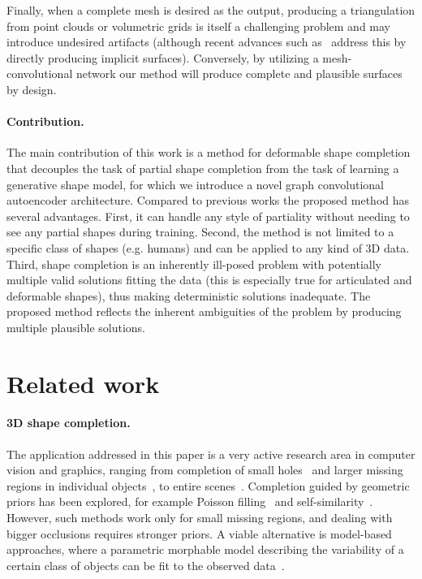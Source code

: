 \documentclass[10pt,twocolumn,letterpaper]{article}
\begin{document}
Finally, when a complete mesh is desired as the output, producing a triangulation from point clouds or volumetric grids is itself a challenging problem and may introduce undesired artifacts (although recent advances such as~\cite{dai2016shape} address this by directly producing implicit surfaces). Conversely, by utilizing a mesh-convolutional network our method will produce complete and plausible surfaces by design.  

\paragraph{Contribution.} The main contribution of this work is a method for deformable shape completion that decouples the task of partial shape completion from the task of learning a generative shape model, for which we introduce a novel graph convolutional autoencoder architecture. Compared to previous works the proposed method has several advantages. First, it can handle any style of partiality without needing to see any partial shapes during training. Second, the method is not limited to a specific class of shapes (e.g. humans) and can be applied to any kind of 3D data. Third, shape completion is an inherently ill-posed problem with potentially multiple valid solutions fitting the data (this is especially true for articulated and deformable shapes), thus making deterministic solutions inadequate. The proposed method reflects the inherent ambiguities of the problem by producing multiple plausible solutions.
%
\section{Related work}\label{sec:relatedwork}\paragraph{3D shape completion.} 
The application addressed in this paper is a very active research area in computer vision and graphics, ranging from completion of small holes~\cite{sarkar2017learning} and larger missing regions in individual objects~\cite{pointcloudGAN,rock2015completing,varley17iros,wu20153d,sharma16eccvw}, to entire scenes~\cite{song2016semantic}.
Completion guided by geometric priors has been explored, for example Poisson filling~\cite{kazhdan2013screened} and self-similarity~\cite{korman2015peeking,sarkar2017learning,litany2016cloud}. However, such methods work only for small missing regions, and dealing with bigger occlusions requires stronger priors. A viable alternative is model-based approaches, where a parametric morphable model describing the variability of a certain class of objects can be fit to the observed data~\cite{blanz1999morphable,gerig2017morphable}. 
\end{document}
